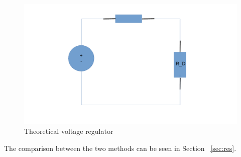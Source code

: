 \begin{figure}[H] \centering
\includegraphics[width=0.8\linewidth]{octave2.pdf}
\caption{Theoretical voltage regulator}
\label{fig:oc2}
\end{figure} 
The comparison between the two methods can be seen in Section ~\ref{sec:res}.
